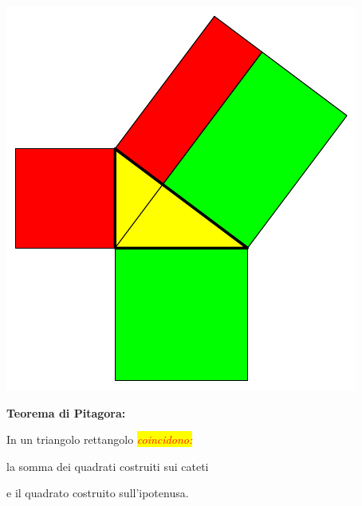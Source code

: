 \documentclass[12pt,italian,oneside]{report}
\newcommand{\rosso}[1]{\textcolor{red}{#1}}
\newcommand{\sfondogiallo}[1]{\colorbox{yellow}{#1}}
\begin{document}
\begin{center}
\includegraphics[scale=1.2]{pitagora3}
\end{center}

\begin{firstheadlineitemize}

\item \textbf{Teorema di Pitagora:}

\begin{secondheadlineitemize}

\item  In un triangolo rettangolo \sfondogiallo{\rosso{\textit{coincidono:}}}

\begin{thirdheadlineitemize}

\item la somma dei quadrati costruiti sui cateti

\item e il quadrato costruito sull'ipotenusa.

\end{thirdheadlineitemize}

\end{secondheadlineitemize}

\end{firstheadlineitemize}

\pageTransitionBlindsV
\end{document}
